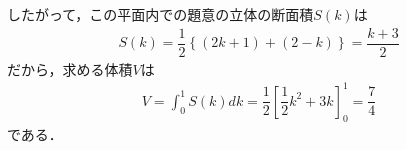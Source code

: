\documentclass[../../main.tex]{subfiles}
\begin{document}
したがって，この平面内での題意の立体の断面積$S(k)$は
\begin{align}
  S(k)=\dfrac{1}{2}\left\{(2k+1)+(2-k)\right\}=\dfrac{k+3}{2}
\end{align}
だから，求める体積$V$は
\begin{align}
  V=\int_0^1S(k)dk=\dfrac{1}{2}\left[\dfrac{1}{2}k^2+3k\right]_0^1=\dfrac{7}{4}\tag{答}
\end{align}
である．

\newpage
\end{document}
